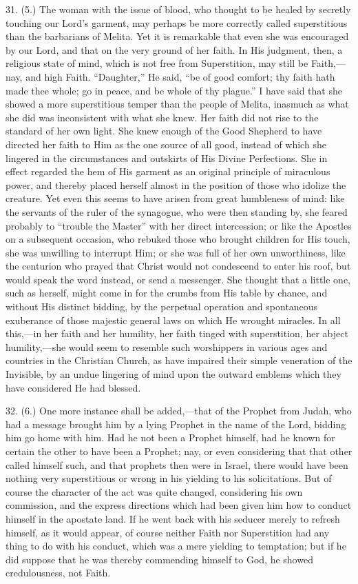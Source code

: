 31. (5.) The woman with the issue of blood, who thought to be
healed by secretly touching our Lord's garment, may perhaps be more
correctly called superstitious than the barbarians of Melita. Yet it
is remarkable that even she was encouraged by our Lord, and that on
the very ground of her faith. In His judgment, then, a religious state
of mind, which is not free from Superstition, may still be Faith,—nay,
and high Faith. ``Daughter,'' He said, ``be of good
comfort; thy faith hath made thee whole; go in peace, and be whole
of
thy plague.'' I have said that she showed a more superstitious
temper than the people of Melita, inasmuch as what she did was
inconsistent with what she knew. Her faith did not rise to the
standard of her own light. She knew enough of the Good Shepherd to
have directed her faith to Him as the one source of all good, instead
of which she lingered in the circumstances and outskirts of His Divine
Perfections. She in effect regarded the hem of His garment as an
original principle of miraculous power, and thereby placed herself
almost in the position of those who idolize the creature. Yet even
this seems to have arisen from great humbleness of mind: like the
servants of the ruler of the synagogue, who were then standing by, she
feared probably to ``trouble the Master'' with her direct
intercession; or like the Apostles on a subsequent occasion, who
rebuked those who brought children for His touch, she was unwilling to
interrupt Him; or she was full of her own unworthiness, like the
centurion who prayed that Christ would not condescend to enter his
roof, but would speak the word instead, or send a messenger. She
thought that a little one, such as herself, might come in for the
crumbs from His table by chance, and without His distinct bidding, by
the perpetual operation and spontaneous exuberance of those majestic
general laws on which He wrought miracles. In all this,—in her faith
and her humility, her faith tinged with superstition, her abject
humility,—she would seem to resemble such worshippers in various
ages and countries in the Christian Church, as have impaired their
simple veneration of the Invisible, by an undue lingering of mind upon
the outward emblems which they have considered He had blessed.

32. (6.) One more instance shall be added,—that of the Prophet
from Judah, who had a message brought him by a lying Prophet in the
name of the Lord, bidding him go home with him. Had he not been a
Prophet himself, had he known for certain the other to have been a
Prophet; nay, or even considering that that other called himself such,
and that prophets then were in Israel, there would have been nothing
very superstitious or wrong in his yielding to his solicitations. But
of course the character of the act was quite changed, considering his
own commission, and the express directions which had been given him
how to conduct himself in the apostate land. If he went back with his
seducer merely to refresh himself, as it would appear, of course
neither Faith nor Superstition had any thing to do with his conduct,
which was a mere yielding to temptation; but if he did suppose that he
was thereby commending himself to God, he showed credulousness, not
Faith.

